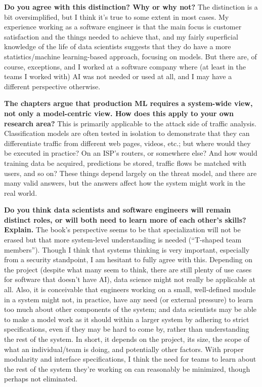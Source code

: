 \documentclass[11pt]{article}
\begin{document}
\textbf{Do you agree with this distinction? Why or why not?} The distinction is a bit oversimplified, but I think it's true to some extent in most cases. My experience working as a software engineer is that the main focus is customer satisfaction and the things needed to achieve that, and my fairly superficial knowledge of the life of data scientists suggests that they do have a more statistics/machine learning-based approach, focusing on models. But there are, of course, exceptions, and I worked at a software company where (at least in the teams I worked with) AI was not needed or used at all, and I may have a different perspective otherwise.


\textbf{The chapters argue that production ML requires a system-wide view, not only
a model-centric view. How does this apply to your own research area?} This is primarily applicable to the attack side of traffic analysis. Classification models are often tested in isolation to demonstrate that they can differentiate traffic from different web pages, videos, etc.; but where would they be executed in practice? On an ISP's routers, or somewhere else? And how would training data be acquired, predictions be stored, traffic flows be matched with users, and so on? These things depend largely on the threat model, and there are many valid answers, but the answers affect how the system might work in the real world.

\textbf{Do you think data scientists and software engineers will remain distinct roles, or
will both need to learn more of each other’s skills? Explain.} The book's perspective seems to be that specialization will not be erased but that more system-level understanding is needed (``T-shaped team members''). Though I think that systems thinking is very important, especially from a security standpoint, I am hesitant to fully agree with this. Depending on the project (despite what many seem to think, there are still plenty of use cases for software that doesn't have AI), data science might not really be applicable at all. Also, it is conceivable that engineers working on a small, well-defined module in a system might not, in practice, have any need (or external pressure) to learn too much about other components of the system; and data scientists may be able to make a model work as it should within a larger system by adhering to strict specifications, even if they may be hard to come by, rather than understanding the rest of the system. In short, it depends on the project, its size, the scope of what an individual/team is doing, and potentially other factors. With proper modularity and interface specifications, I think the need for teams to learn about the rest of the system they're working on can reasonably be minimized, though perhaps not eliminated.
\end{document}
